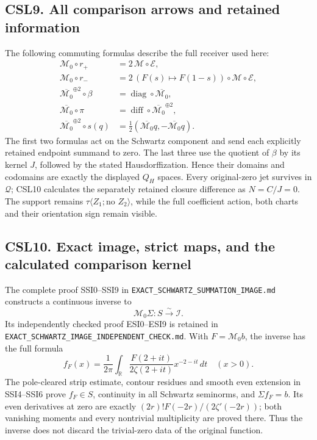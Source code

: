 \subsection{CSL9. All comparison arrows and retained
information}\label{csl9.-all-comparison-arrows-and-retained-information}

The following commuting formulas describe the full receiver used here:
\[
\begin{aligned}
\mathcal M_0\circ r_+&=2\,\mathcal M\circ\mathcal E,\\
\mathcal M_0\circ r_-&=2\,(F(s)\mapsto F(1-s))\circ\mathcal M\circ\mathcal E,\\
\overline{\mathcal M_0}^{\oplus2}\circ\beta
&=\operatorname{diag}\circ\overline{\mathcal M_0},\\
\overline{\mathcal M_0}\circ\pi
&=\operatorname{diff}\circ\overline{\mathcal M_0}^{\oplus2},\\
\overline{\mathcal M_0}^{\oplus2}\circ s(q)
&=\tfrac12(\overline{\mathcal M_0}q,-\overline{\mathcal M_0}q).
\end{aligned}
\tag{CSL9.1}
\] The first two formulas act on the Schwartz component and send each
explicitly retained endpoint summand to zero. The last three use the
quotient of \(\beta\) by its kernel \(J\), followed by the stated
Hausdorffization. Hence their domains and codomains are exactly the
displayed \(Q_H\) spaces. Every original-zero jet survives in
\(\mathcal Q\); CSL10 calculates the separately retained closure
difference as \(N=C/J=0\). The support remains
\(\tau\langle Z_1;\text{no }Z_2\rangle\), while the full coefficient
action, both charts and their orientation sign remain visible.

\subsection{CSL10. Exact image, strict maps, and the calculated
comparison
kernel}\label{csl10.-exact-image-strict-maps-and-the-calculated-comparison-kernel}

The complete proof SSI0--SSI9 in
\nolinkurl{EXACT_SCHWARTZ_SUMMATION_IMAGE.md} constructs a continuous
inverse to \[
\mathcal M_0\Sigma:S\xrightarrow{\sim}\mathcal I.
\tag{CSL10.1}
\] Its independently checked proof ESI0--ESI9 is retained in
\nolinkurl{EXACT_SCHWARTZ_IMAGE_INDEPENDENT_CHECK.md}. With
\(F=\mathcal M_0b\), the inverse has the full formula \[
f_F(x)=\frac1{2\pi}\int_{\mathbb R}
\frac{F(2+it)}{2\zeta(2+it)}x^{-2-it}\,dt\quad(x>0).
\tag{CSL10.2}
\] The pole-cleared strip estimate, contour residues and smooth even
extension in SSI4--SSI6 prove \(f_F\in S\), continuity in all Schwartz
seminorms, and \(\Sigma f_F=b\). Its even derivatives at zero are
exactly \((2r)!F(-2r)/(2\zeta'(-2r))\); both vanishing moments and every
nontrivial multiplicity are proved there. Thus the inverse does not
discard the trivial-zero data of the original function.

